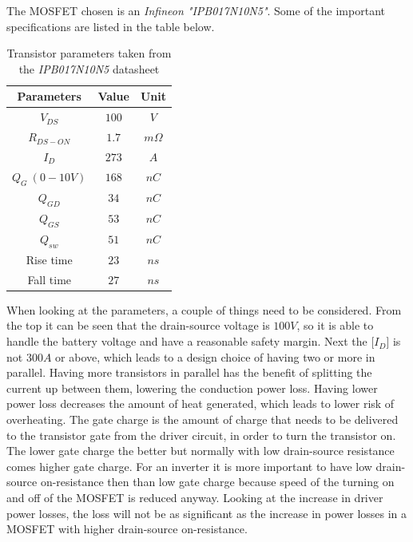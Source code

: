 The MOSFET chosen is an \textit{Infineon "IPB017N10N5"}. Some of the important specifications are listed in the table below.
\begin{table} [H]
\centering
 \begin{tabular}{|c|c|c|} 
 \hline
 \textbf{Parameters} & \textbf{Value} & \textbf{Unit} \\
 \hline
 \textbf{$V_{DS}$} & $100$ & $V$ \\  
 \hline
 \textbf{$R_{DS-ON}$} & $1.7$ & $m\Omega$ \\
 \hline
 \textbf{$I_D$} & $273$ & $A$ \\
 \hline
 \textbf{$Q_G\ (0-10V)$} & $168$ & $nC$ \\
 \hline
 \textbf{$Q_{GD}$} & $34$ & $nC$ \\
 \hline
 \textbf{$Q_{GS}$} & $53$ & $nC$ \\
 \hline
 \textbf{$Q_{sw}$} & $51$ & $nC$ \\
 \hline
 Rise time & $23$ & $ns$ \\
 \hline
 Fall time & $27$ & $ns$ \\
 \hline
\end{tabular}
\caption{Transistor parameters taken from the \textit{IPB017N10N5} datasheet}
\end{table}

When looking at the parameters, a couple of things need to be considered. From the top it can be seen that the drain-source voltage is $100 V$, so it is able to handle the battery voltage and have a reasonable safety margin. 
Next the [$I_D$] is not $300 A$ or above, which leads to a design choice of having two or more in parallel. Having more transistors in parallel has the benefit of splitting the current up between them, lowering the conduction power loss. 
Having lower power loss decreases the amount of heat generated, which leads to lower risk of overheating. 
The gate charge is the amount of charge that needs to be delivered to the transistor gate from the driver circuit, in order to turn the transistor on. 
The lower gate charge the better but normally with low drain-source resistance comes higher gate charge.
For an inverter it is more important to have low drain-source on-resistance then than low gate charge because speed of the turning on and off of the MOSFET is reduced anyway. Looking at the increase in driver power losses, the loss will not be as significant as the increase in power losses in a MOSFET with higher drain-source on-resistance.\\ 



